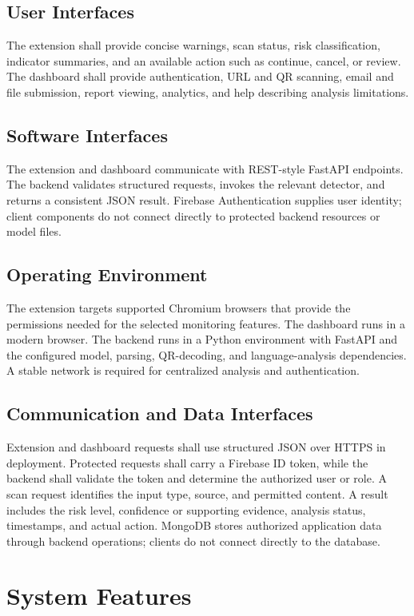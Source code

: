 \subsection{User Interfaces}
The extension shall provide concise warnings, scan status, risk classification,
indicator summaries, and an available action such as continue, cancel, or review.
The dashboard shall provide authentication, URL and QR scanning, email and file
submission, report viewing, analytics, and help describing analysis limitations.

\subsection{Software Interfaces}
The extension and dashboard communicate with REST-style FastAPI endpoints. The
backend validates structured requests, invokes the relevant detector, and returns a
consistent JSON result. Firebase Authentication supplies user identity; client
components do not connect directly to protected backend resources or model files.

\subsection{Operating Environment}
The extension targets supported Chromium browsers that provide the permissions
needed for the selected monitoring features. The dashboard runs in a modern browser.
The backend runs in a Python environment with FastAPI and the configured model,
parsing, QR-decoding, and language-analysis dependencies. A stable network is
required for centralized analysis and authentication.

\subsection{Communication and Data Interfaces}
Extension and dashboard requests shall use structured JSON over HTTPS in deployment.
Protected requests shall carry a Firebase ID token, while the backend shall validate
the token and determine the authorized user or role. A scan request identifies the
input type, source, and permitted content. A result includes the risk level,
confidence or supporting evidence, analysis status, timestamps, and actual action.
MongoDB stores authorized application data through backend operations; clients do
not connect directly to the database.

\section{System Features}

